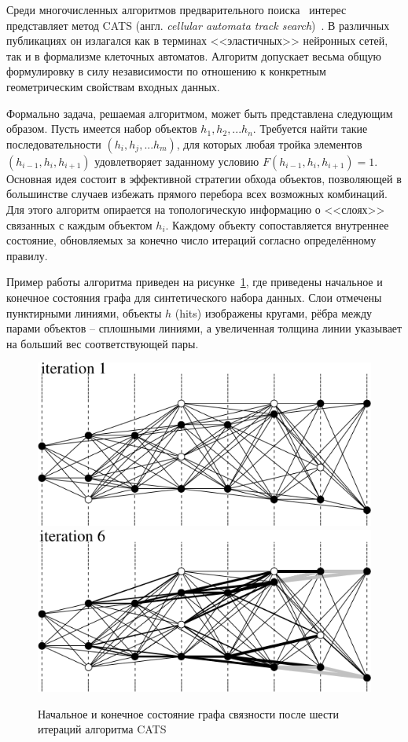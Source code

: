 Среди многочисленных алгоритмов предварительного поиска~\cite{MankelTracking}
интерес представляет метод CATS
(англ. \emph{cellular automata track search})~\cite{catsc-JINR, catsc-discrete, catsc-nim, catsc-disto}.
В различных публикациях он излагался как в терминах <<эластичных>>
нейронных сетей, так и в формализме клеточных автоматов. 
Алгоритм допускает весьма общую формулировку в силу независимости по
отношению к конкретным геометрическим свойствам входных данных.

Формально задача, решаемая алгоритмом, может быть представлена следующим образом.
Пусть имеется
набор объектов $h_1,h_2, ...h_n$. Требуется найти такие
последовательности $(h_i,h_j,...h_m)$, для которых любая тройка
элементов $(h_{i-1},h_{i},h_{i+1})$ удовлетворяет заданному
условию $F(h_{i-1},h_{i},h_{i+1})=1$.
Основная идея состоит в эффективной стратегии обхода
объектов, позволяющей в большинстве случаев избежать прямого перебора
всех возможных комбинаций. Для этого алгоритм опирается на топологическую информацию
о <<слоях>> связанных с каждым объектом $h_i$. Каждому объекту сопоставляется
внутреннее состояние, обновляемых за конечно число итераций согласно
определённому правилу.

Пример работы алгоритма приведен на рисунке~\ref{fig:catsc-nim},
где приведены начальное и конечное состояния графа для синтетического набора
данных. Слои отмечены пунктирными
линиями, объекты $h$ (hits) изображены кругами, рёбра между парами
объектов -- сплошными линиями, а увеличенная толщина линии указывает
на больший вес соответствующей пары.

\begin{figure}
    \centering
    \includegraphics[width=0.45\linewidth]{images//illustrative/catsc-quote-it1.png}
    \includegraphics[width=0.45\linewidth]{images//illustrative/catsc-quote-it6.png}
    \caption{Начальное и конечное состояние графа связности после шести итераций алгоритма CATS~\cite{catsc-nim}}
    \label{fig:catsc-nim}
\end{figure}

